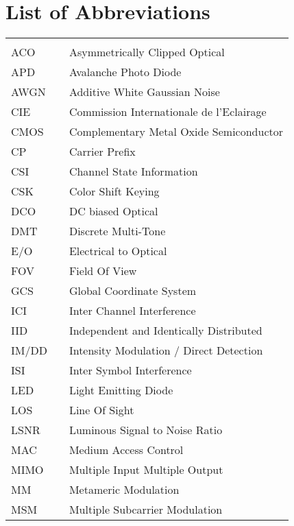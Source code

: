 \chapter*{List of Abbreviations}
\begin{center}
  \begin{longtable}{lll}
    \hspace*{2em} & \hspace*{1in} & \hspace*{4.5in} \\
    ACO & \dotfill & Asymmetrically Clipped Optical \\
		APD & \dotfill & Avalanche Photo Diode \\
		AWGN & \dotfill & Additive White Gaussian Noise \\
		CIE & \dotfill & Commission Internationale de l'Eclairage \\
		CMOS & \dotfill & Complementary Metal Oxide Semiconductor \\
		CP & \dotfill & Carrier Prefix \\
		CSI & \dotfill & Channel State Information \\
		CSK & \dotfill & Color Shift Keying \\
		DCO & \dotfill & DC biased Optical \\
		DMT & \dotfill & Discrete Multi-Tone \\
		E/O & \dotfill & Electrical to Optical \\
		FOV & \dotfill & Field Of View \\
		GCS & \dotfill & Global Coordinate System \\
		ICI & \dotfill & Inter Channel Interference \\
		IID & \dotfill & Independent and Identically Distributed \\
		IM/DD & \dotfill & Intensity Modulation / Direct Detection \\
		ISI & \dotfill & Inter Symbol Interference \\
		LED & \dotfill & Light Emitting Diode \\
		LOS & \dotfill & Line Of Sight \\
		LSNR & \dotfill & Luminous Signal to Noise Ratio \\
		MAC & \dotfill & Medium Access Control \\
		MIMO & \dotfill & Multiple Input Multiple Output \\
		MM & \dotfill & Metameric Modulation \\
		MSM & \dotfill & Multiple Subcarrier Modulation \\

\end{longtable}
\end{center}

